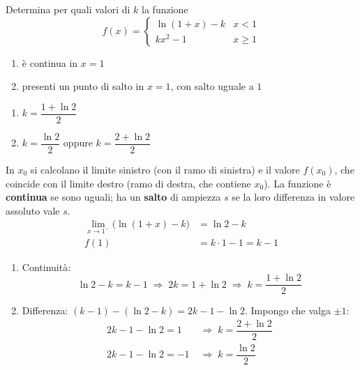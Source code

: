 \begin{question}[ID=4.2, subtitle={Continuità e salto di $f$ con $\ln(1+x)-k$ e $kx^2-1$ in $x=1$}, tags={continuità, parametrico}, difficulty=media]
Determina per quali valori di $k$ la funzione
\[
f(x) = \begin{cases}
    \ln(1+x) - k & x < 1 \\
    kx^2 - 1 & x \ge 1
\end{cases}
\]
\begin{enumerate}
\item è continua in $x=1$
\item presenti un punto di salto in $x=1$, con salto uguale a $1$
\end{enumerate}
\begin{solution}
\begin{enumerate}
    \item $k=\dfrac{1+\ln2}{2}$
    \item $k=\dfrac{\ln2}{2}$ oppure $k=\dfrac{2+\ln2}{2}$
\end{enumerate}
\end{solution}
\begin{explanation}
In $x_0$ si calcolano il limite sinistro (con il ramo di sinistra) e il valore $f(x_0)$, che coincide con il limite destro (ramo di destra, che contiene $x_0$). La funzione è \textbf{continua} se sono uguali; ha un \textbf{salto} di ampiezza $s$ se la loro differenza in valore assoluto vale $s$.
\[\begin{aligned}
\lim_{x\to1^-}\big(\ln(1+x)-k\big) &= \ln2-k\\
f(1) &= k\cdot1-1=k-1
\end{aligned}\]
\begin{enumerate}
    \item Continuità:
    \[ \ln2-k=k-1 \;\Rightarrow\; 2k=1+\ln2 \;\Rightarrow\; k=\dfrac{1+\ln2}{2} \]
    \item Differenza: $(k-1)-(\ln2-k)=2k-1-\ln2$. Impongo che valga $\pm1$:
    \[\begin{aligned}
    2k-1-\ln2=1 &\;\Rightarrow\; k=\dfrac{2+\ln2}{2}\\
    2k-1-\ln2=-1 &\;\Rightarrow\; k=\dfrac{\ln2}{2}
    \end{aligned}\]
\end{enumerate}
\end{explanation}
\end{question}


